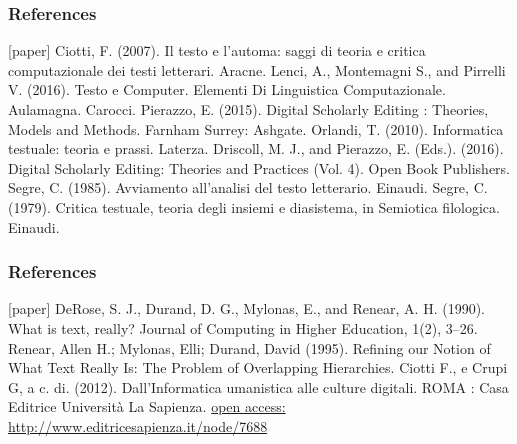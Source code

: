 




\begin{frame}
    \frametitle{References}
    \addtocounter{nframe}{1}
    \begin{thebibliography}{10}
        [paper]
        \tiny{} Ciotti, F. (2007). Il testo e l’automa: saggi di teoria e critica computazionale dei testi letterari. Aracne.
        \tiny{} Lenci, A., Montemagni S., and Pirrelli V. (2016). Testo e Computer. Elementi Di Linguistica Computazionale. Aulamagna. Carocci.
        \tiny{} Pierazzo, E. (2015). Digital Scholarly Editing : Theories, Models and Methods. Farnham Surrey: Ashgate.
        \tiny{} Orlandi, T. (2010). Informatica testuale: teoria e prassi. Laterza.
        \tiny{} Driscoll, M. J., and Pierazzo, E. (Eds.). (2016). Digital Scholarly Editing: Theories and Practices (Vol. 4). Open Book Publishers.
        \tiny{} Segre, C. (1985). Avviamento all'analisi del testo letterario. Einaudi.
        \tiny{} Segre, C. (1979). Critica testuale, teoria degli insiemi e diasistema, in Semiotica filologica. Einaudi.
    \end{thebibliography}

\end{frame}

\begin{frame}
    \frametitle{References}
    \addtocounter{nframe}{1}
    \begin{thebibliography}{10}
        [paper]
        \tiny{} DeRose, S. J., Durand, D. G., Mylonas, E., and Renear, A. H. (1990). What is text, really? Journal of Computing in Higher Education, 1(2), 3–26.
        \tiny{} Renear, Allen H.; Mylonas, Elli; Durand, David (1995). Refining our Notion of What Text Really Is: The Problem of Overlapping Hierarchies.
        \tiny{} Ciotti F., e Crupi G, a c. di. (2012). Dall’Informatica umanistica alle culture digitali. ROMA : Casa Editrice Università La Sapienza. \href{http://www.editricesapienza.it/node/7688}{open access: http://www.editricesapienza.it/node/7688}
    \end{thebibliography}

\end{frame}


